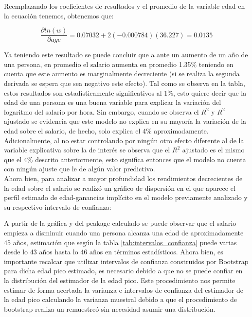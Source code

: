 \documentclass[12pt]{article}
\begin{document}
Reemplazando los coeficientes de resultados y el promedio de la variable edad en la ecuación tenemos, obtenemos que:


$$\frac{\partial ln(w)}{\partial age}=0.07032+2 (-0.000784)(36.227)=0.0135$$

Ya teniendo este resultado se puede concluir que a ante un aumento de un año de una persona, en promedio el salario aumenta en promedio 1.35\% teniendo en cuenta que este aumento es marginalmente decreciente (si se realiza la segunda derivada se espera que sea negativo este efecto). Tal como se observa en la tabla, estos resultados son estadísticamente significativos al 1\%, esto quiere decir que la edad de una persona es una buena variable para explicar la variación del logaritmo del salario por hora. Sin embargo, cuando se observa el $R^{2}$ y $R^{2}$ ajustado se evidencia que este modelo no explica en su mayoría la variación de la edad sobre el salario, de hecho, solo explica el $4\%$ aproximadamente. Adicionalmente, al no estar controlando por ningún otro efecto diferente al de la variable explicativa sobre la de interés se observa que el $R^2$ ajustado es el mismo que el $4\%$ descrito anteriormente, esto significa entonces que el modelo no cuenta con ningún ajuste que le de algún valor predictivo.
\\

Ahora bien, para analizar a mayor profundidad los rendimientos decrecientes de la edad sobre el salario se realizó un gráfico de dispersión en el que aparece el perfil estimado de edad-ganancias implícito en el modelo previamente analizado y su respectivo intervalo de confianza:





A partir de la gráfica y del peakage calculado se puede observar que el salario empieza a disminuir cuando una persona alcanza una edad de aproximadamente 45 años, estimación que según la tabla \ref{tab:intervalos_confianza} puede varias desde lo 43 años hasta lo 46 años en términos estadísticos. Ahora bien, es importante recalcar que utilizar intervalos de confianza construidos por Bootstrap para dicha edad pico estimado, es necesario debido a que no se puede confiar en la distribución del estimador de la edad pico. Este procedimiento nos permite estimar de forma acertada la varianza e intervalos de confianza del estimador de la edad pico calculando la varianza muestral debido a que el procedimiento de bootstrap realiza un remuestreó sin necesidad asumir una distribución. \\
\end{document}
